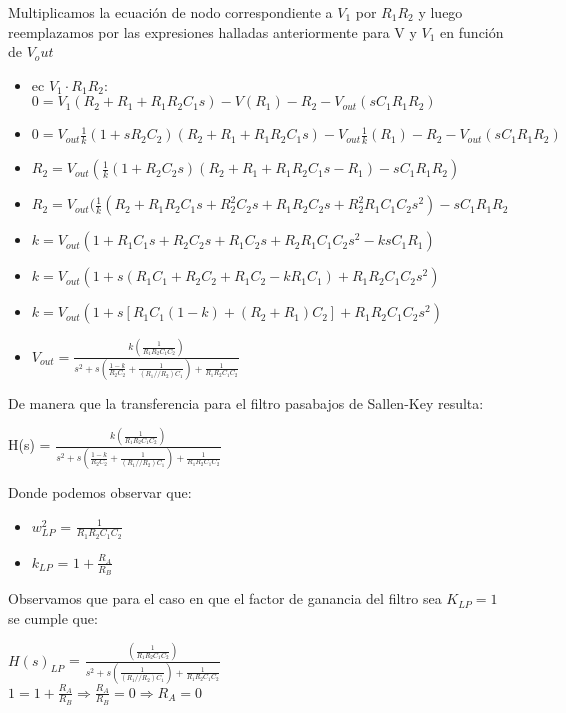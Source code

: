 \documentclass[12pt, titlepage]{article}
\begin{document}
    
    Multiplicamos la ecuación de nodo correspondiente a $V_{1}$ por $R_1R_2$ y luego reemplazamos por las expresiones halladas anteriormente para V y $V_1$ en función de $V_out$
    \begin{itemize}
        \item ec $V_1\cdot R_1 R_2:$\hspace{5mm} $0=V_1(R_2+R_1+R_1R_2C_1s)-V(R_1)-R_2-V_{out}(sC_1R_1R_2)$
        \item $0 = V_{out}\frac{1}{k}(1+sR_2C_2)(R_2+R_1+R_1R_2C_1s) -V_{out}\frac{1}{k}(R_1)-R_2-V_{out}(sC_1R_1R_2)$
        \item $R_2 = V_{out}(\frac{1}{k}(1+R_2C_2s)(R_2+R_1+R_1R_2C_1s-R_1)-sC_1R_1R_2)$
        \item $R_2 = V_{out}(\frac{1}{k}(R_2+R_1R_2C_1s+R_2^2C_2s+R_1R_2C_2s+R_2^2R_1C_1C_2s^2)-sC_1R_1R_2$
        \item $k = V_{out}(1+R_1C_1s+R_2C_2s+R_1C_2s+R_2R_1C_1C_2s^2 - ksC_1R_1)$
        \item $k = V_{out}(1+s(R_1C_1+R_2C_2+R_1C_2-kR_1C_1) + R_1R_2C_1C_2s^2 )$
        \item $k = V_{out}(1+s[R_1C_1(1-k)+(R_2+R_1)C_2] + R_1R_2C_1C_2s^2 )$
        \item $V_{out} = \frac{k (\frac{1}{R_1R_2C_1C_2})}{s^2 + s(\frac{1-k}{R_2C_2}+\frac{1}{(R_1//R_2)C_1})+ \frac{1}{ R_1R_2C_1C_2}}$
    \end{itemize}
    
    De manera que la transferencia para el filtro pasabajos de Sallen-Key resulta:
    \begin{center}
        H(s) = $\frac{k (\frac{1}{R_1R_2C_1C_2})}{s^2 + s(\frac{1-k}{R_2C_2}+\frac{1}{(R_1//R_2)C_1})+ \frac{1}{ R_1R_2C_1C_2}}$
    \end{center}
    
    Donde podemos observar que:
    \begin{itemize}
        \item $w_{LP}^2$ = $\frac{1}{R_1R_2 C_1 C_2}$
        \item $k_{LP}$ = $1+\frac{R_A}{R_B}$
    \end{itemize}
    
    Observamos que para el caso en que el factor de ganancia del filtro sea $K_{LP} = 1$ se cumple que:
    \begin{center}
    $H(s)_{LP}$ = $\frac{(\frac{1}{R_1R_2C_1C_2})}{s^2 + s(\frac{1}{(R_1//R_2)C_1})+ \frac{1}{ R_1R_2C_1C_2}}$\\
    \vspace{4mm}
    $1 = 1+\frac{R_A}{R_B} \Rightarrow \frac{R_A}{R_B} = 0 \Rightarrow R_A = 0$
    \end{center}
    
\end{document}
